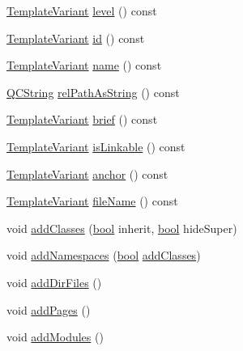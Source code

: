 \begin{DoxyCompactItemize}
\item 
\hyperlink{class_template_variant}{Template\+Variant} \hyperlink{class_nesting_node_context_1_1_private_a82129173021c178f5fdb64c16526769d}{level} () const 
\item 
\hyperlink{class_template_variant}{Template\+Variant} \hyperlink{class_nesting_node_context_1_1_private_ac2a2f201dd9e9e8e4f68014265c08392}{id} () const 
\item 
\hyperlink{class_template_variant}{Template\+Variant} \hyperlink{class_nesting_node_context_1_1_private_a25a122660a3f12b8b8370e546218baaa}{name} () const 
\item 
\hyperlink{class_q_c_string}{Q\+C\+String} \hyperlink{class_nesting_node_context_1_1_private_a353ddfe8fd5efbf53478a20ff48e702f}{rel\+Path\+As\+String} () const 
\item 
\hyperlink{class_template_variant}{Template\+Variant} \hyperlink{class_nesting_node_context_1_1_private_adbf19ec344a2c695b2420da5434d9b07}{brief} () const 
\item 
\hyperlink{class_template_variant}{Template\+Variant} \hyperlink{class_nesting_node_context_1_1_private_ab863022074fa17f725739931421bc1f4}{is\+Linkable} () const 
\item 
\hyperlink{class_template_variant}{Template\+Variant} \hyperlink{class_nesting_node_context_1_1_private_a8b1c63071b2a9ae36d00c91cebeab106}{anchor} () const 
\item 
\hyperlink{class_template_variant}{Template\+Variant} \hyperlink{class_nesting_node_context_1_1_private_af5ba5141818025b580dca61271335d7b}{file\+Name} () const 
\item 
void \hyperlink{class_nesting_node_context_1_1_private_ae743fd0e019340de9d88d0d06ded1a14}{add\+Classes} (\hyperlink{qglobal_8h_a1062901a7428fdd9c7f180f5e01ea056}{bool} inherit, \hyperlink{qglobal_8h_a1062901a7428fdd9c7f180f5e01ea056}{bool} hide\+Super)
\item 
void \hyperlink{class_nesting_node_context_1_1_private_a3fc8a869a7ceaed7e8f555a982c8a326}{add\+Namespaces} (\hyperlink{qglobal_8h_a1062901a7428fdd9c7f180f5e01ea056}{bool} \hyperlink{class_nesting_node_context_1_1_private_ae743fd0e019340de9d88d0d06ded1a14}{add\+Classes})
\item 
void \hyperlink{class_nesting_node_context_1_1_private_a6febf1fe002a5c7a981ca427dbd1cb94}{add\+Dir\+Files} ()
\item 
void \hyperlink{class_nesting_node_context_1_1_private_a0a475a7bdce9149fd9da99041efed8ca}{add\+Pages} ()
\item 
void \hyperlink{class_nesting_node_context_1_1_private_a9667340174e7b99f769db10b78478a5e}{add\+Modules} ()
\end{DoxyCompactItemize}


